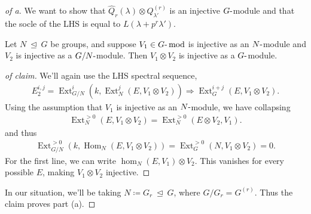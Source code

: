 \begin{proof}[of a]

We want to show that
\(\widehat{Q}_r(\lambda) \otimes Q_{\lambda'}^{(r)}\) is an injective
\(G{\hbox{-}}\)module and that the socle of the LHS is equal to
\(L(\lambda + p^r \lambda')\).

\begin{claim}

Let \(N{~\trianglelefteq~}G\) be groups, and suppose
\(V_1 \in {{G}{\hbox{-}}\operatorname{mod}}\) is injective as an
\(N{\hbox{-}}\)module and \(V_2\) is injective as a
\(G/N{\hbox{-}}\)module. Then \(V_1 \otimes V_2\) is injective as a
\(G{\hbox{-}}\)module.

\end{claim}

\begin{proof}[of claim]

We'll again use the LHS spectral sequence,
\begin{align*}  
E_{2}^{i, j} = \operatorname{Ext}_{G/N}^i(k, \operatorname{Ext}_N^j(E, V_1\otimes V_2) )
\Rightarrow
\operatorname{Ext}_G^{i+j}(E, V_1 \otimes V_2)
.\end{align*}
Using the assumption that \(V_1\) is injective as an
\(N{\hbox{-}}\)module, we have collapsing
\begin{align*}  
\operatorname{Ext}_N^{>0}(E, V_1\otimes V_2) = \operatorname{Ext}_N^{>0} (E\otimes V_2, V_1)
.\end{align*}
and thus
\begin{align*}  
\operatorname{Ext}_{G/N}^{>0}(k, {\operatorname{Hom}}_N(E, V_1\otimes V_2) )
= \operatorname{Ext}_G^{>0}(N, V_1\otimes V_2)
= 0
.\end{align*}
For the first line, we can write \(\hom_N(E, V_1) \otimes V_2\). This
vanishes for every possible \(E\), making \(V_1\otimes V_2\) injective.

\end{proof}

In our situation, we'll be taking
\(N\coloneqq G_r {~\trianglelefteq~}G\), where \(G/G_r = G^{(r)}\). Thus
the claim proves part (a).

\end{proof}

